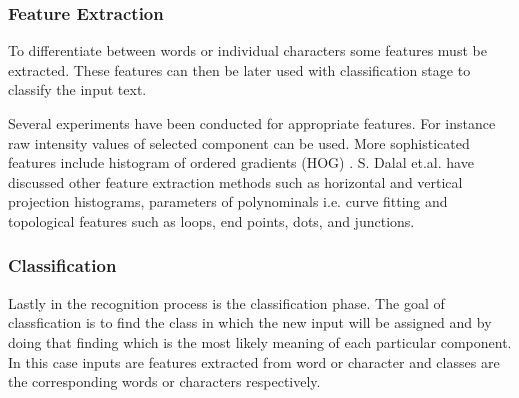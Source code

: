 \documentclass{article}
\begin{document}
      \subsubsection{Feature Extraction}
        To differentiate between words or individual characters some features must be extracted. These features can then be later used with classification stage to classify the input text.

        Several experiments have been conducted for appropriate features. For instance raw intensity values of selected component can be used. More sophisticated features include histogram of ordered gradients (HOG) \cite{Dalal2005}. S. Dalal et.al. have discussed other feature extraction methods such as horizontal and vertical projection histograms, parameters of polynominals i.e. curve fitting and topological features such as loops, end points, dots, and junctions. \cite{Dalal}

      \subsubsection{Classification}
        Lastly in the recognition process is the classification phase. The goal of classfication is to find the class in which the new input will be assigned and by doing that finding which is the most likely meaning of each particular component. In this case inputs are features extracted from word or character and classes are the corresponding words or characters respectively.
\end{document}
